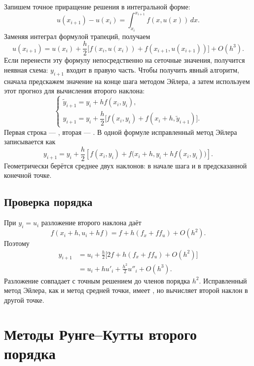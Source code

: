 \documentclass[../final.tex]{subfiles}
\begin{document}
Запишем точное приращение решения в интегральной форме:
\begin{equation*}
    u(x_{i+1})-u(x_i)
    =\int_{x_i}^{x_{i+1}}f(x,u(x))\,dx.
\end{equation*}
Заменяя интеграл формулой трапеций, получаем
\begin{equation*}
    u(x_{i+1})=u(x_i)+\frac h2
    \bigl[f(x_i,u(x_i))+f(x_{i+1},u(x_{i+1}))\bigr]+O(h^3).
\end{equation*}
Если перенести эту формулу непосредственно на сеточные значения, получится
неявная схема: $y_{i+1}$ входит в правую часть. Чтобы получить явный
алгоритм, сначала предскажем значение на конце шага методом Эйлера,
а затем используем этот прогноз для вычисления второго наклона:
\begin{equation*}
    \begin{cases}
        \widetilde y_{i+1}=y_i+h f(x_i,y_i),\\[0.4em]
        y_{i+1}=y_i+\dfrac h2
        \bigl[f(x_i,y_i)+f(x_i+h,\widetilde y_{i+1})\bigr].
    \end{cases}
\end{equation*}
Первая строка --- , вторая ---
. В одной формуле исправленный метод Эйлера
записывается как
\begin{equation*}
    y_{i+1}=y_i+\frac h2\left[
    f(x_i,y_i)+f\bigl(x_i+h,y_i+h f(x_i,y_i)\bigr)\right].
\end{equation*}
Геометрически берётся среднее двух наклонов: в начале шага и
в предсказанной конечной точке.

\subsection{Проверка порядка}

При $y_i=u_i$ разложение второго наклона даёт
\begin{equation*}
    f(x_i+h,u_i+hf)=f+h(f_x+f f_u)+O(h^2).
\end{equation*}
Поэтому
\begin{align*}
    y_{i+1}
    &=u_i+\frac h2\bigl[2f+h(f_x+f f_u)+O(h^2)\bigr]\\
    &=u_i+hu'_i+\frac{h^2}{2}u''_i+O(h^3).
\end{align*}
Разложение совпадает с точным решением до членов порядка $h^2$.
Исправленный метод Эйлера, как и метод средней точки, имеет
, но вычисляет второй наклон
в другой точке.

\section{Методы Рунге--Кутты второго порядка}
\end{document}
